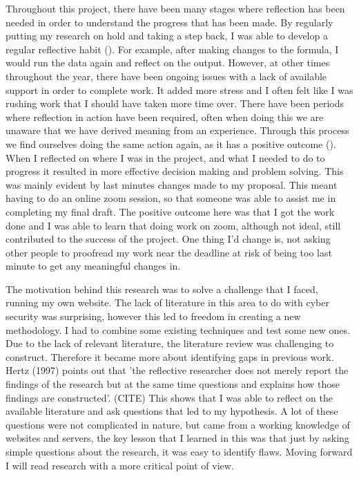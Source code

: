 
Throughout this project, there have been many stages where reflection has been needed in order to understand the progress that has been made. By regularly putting my research on hold and taking a step back, I was able to develop a regular reflective habit  (\cite{dyment2010quality}). For example, after making changes to the formula, I would run the data again and reflect on the output. However, at other times throughout the year, there have been ongoing issues with a lack of available support in order to complete work. It added more stress and I often felt like I was rushing work that I should have taken more time over. There have been periods where reflection in action have been required, often when doing this we are unaware that we have derived meaning from an experience. Through this process we find ourselves doing the same action again, as it has a positive outcome (\cite{Schon83}). When I reflected on where I was in the project, and what I needed to do to progress it resulted in more effective decision making and problem solving. This was mainly evident by last minutes changes made to my proposal. This meant having to do an online zoom session, so that someone was able to assist me in completing my final draft. The positive outcome here was that I got the work done and I was able to learn that doing work on zoom, although not ideal, still contributed to the success of the project. One thing I'd change is, not asking other people to proofread my work near the deadline at risk of being too last minute to get any meaningful changes in.

The motivation behind this research was to solve a challenge that I faced, running my own website. The lack of literature in this area to do with cyber security was surprising, however this led to freedom in creating a new methodology. I had to combine some existing techniques and test some new ones. Due to the lack of relevant literature, the literature review was challenging to construct. Therefore it became more about identifying gaps in previous work. Hertz (1997) points out that 'the reflective researcher does not merely report the findings of the research but at the same time questions and explains how those findings are constructed'. (CITE) This shows that I was able to reflect on the available literature and ask questions that led to my hypothesis. A lot of these questions were not complicated in nature, but came from a working knowledge of websites and servers, the key lesson that I learned in this was that just by asking simple questions about the research, it was easy to identify flaws. Moving forward I will read research with a more critical point of view.



